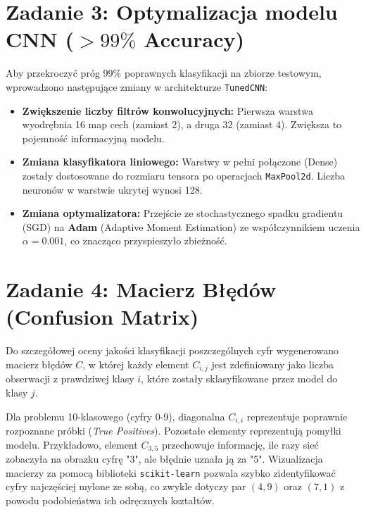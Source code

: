 \documentclass[12pt,a4paper]{article}
\begin{document}
\section{Zadanie 3: Optymalizacja modelu CNN ($>99\%$ Accuracy)}
Aby przekroczyć próg 99\% poprawnych klasyfikacji na zbiorze testowym, wprowadzono następujące zmiany w architekturze \texttt{TunedCNN}:
\begin{itemize}
    \item \textbf{Zwiększenie liczby filtrów konwolucyjnych:} Pierwsza warstwa wyodrębnia 16 map cech (zamiast 2), a druga 32 (zamiast 4). Zwiększa to pojemność informacyjną modelu.
    \item \textbf{Zmiana klasyfikatora liniowego:} Warstwy w pełni połączone (Dense) zostały dostosowane do rozmiaru tensora po operacjach \texttt{MaxPool2d}. Liczba neuronów w warstwie ukrytej wynosi 128.
    \item \textbf{Zmiana optymalizatora:} Przejście ze stochastycznego spadku gradientu (SGD) na \textbf{Adam} (Adaptive Moment Estimation) ze współczynnikiem uczenia $\alpha = 0.001$, co znacząco przyspieszyło zbieżność.
\end{itemize}

\section{Zadanie 4: Macierz Błędów (Confusion Matrix)}
Do szczegółowej oceny jakości klasyfikacji poszczególnych cyfr wygenerowano macierz błędów $C$, w której każdy element $C_{i,j}$ jest zdefiniowany jako liczba obserwacji z prawdziwej klasy $i$, które zostały sklasyfikowane przez model do klasy $j$.

Dla problemu 10-klasowego (cyfry 0-9), diagonalna $C_{i,i}$ reprezentuje poprawnie rozpoznane próbki (\textit{True Positives}). Pozostałe elementy reprezentują pomyłki modelu. 
Przykładowo, element $C_{3,5}$ przechowuje informację, ile razy sieć zobaczyła na obrazku cyfrę "3", ale błędnie uznała ją za "5". Wizualizacja macierzy za pomocą biblioteki \texttt{scikit-learn} pozwala szybko zidentyfikować cyfry najczęściej mylone ze sobą, co zwykle dotyczy par $(4,9)$ oraz $(7,1)$ z powodu podobieństwa ich odręcznych kształtów.
\end{document}
